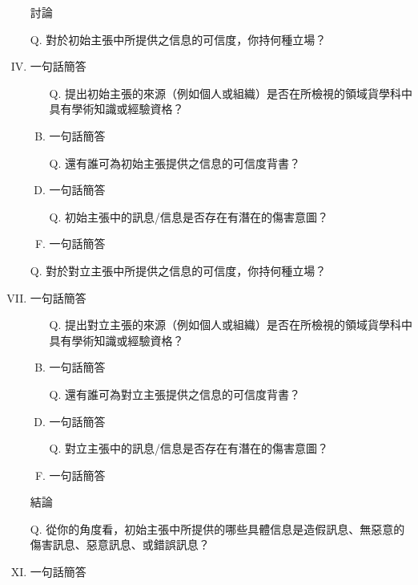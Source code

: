 \documentclass[a4paper, 12pt]{article}
\begin{document}
\begin{enumerate}[I.]
    \item [] %
    \item [] 討論
    \item [Q.] 對於{\color{blue}初始主張}中所提供之信息的可信度，你持何種立場？
    \item {\color{gray}一句話簡答} %
          \begin{enumerate}[A.]
              \item [Q.]提出{\color{blue}初始主張}的來源（例如個人或組織）是否在所檢視的領域貨學科中具有學術知識或經驗資格？
              \item {\color{gray}一句話簡答} %
              \item [Q.]還有誰可為{\color{blue}初始主張}提供之信息的可信度背書？
              \item {\color{gray}一句話簡答}
              \item [Q.]{\color{blue}初始主張}中的訊息/信息是否存在有潛在的傷害意圖？
              \item {\color{gray}一句話簡答}
          \end{enumerate}
    \item []
    \item [Q.] 對於{\color{red}對立主張}中所提供之信息的可信度，你持何種立場？
    \item {\color{gray}一句話簡答} %
          \begin{enumerate}[A.]
              \item [Q.]提出{\color{red}對立主張}的來源（例如個人或組織）是否在所檢視的領域貨學科中具有學術知識或經驗資格？
              \item {\color{gray}一句話簡答} %
              \item [Q.]還有誰可為{\color{red}對立主張}提供之信息的可信度背書？
              \item {\color{gray}一句話簡答}
              \item [Q.]{\color{red}對立主張}中的訊息/信息是否存在有潛在的傷害意圖？
              \item {\color{gray}一句話簡答}
          \end{enumerate}
    \item [] %
    \item [] 結論
    \item [Q.] 從你的角度看，{\color{blue}初始主張}中所提供的哪些具體信息是造假訊息、無惡意的傷害訊息、惡意訊息、或錯誤訊息？
    \item {\color{gray}一句話簡答} %

\end{enumerate}
\end{document}
